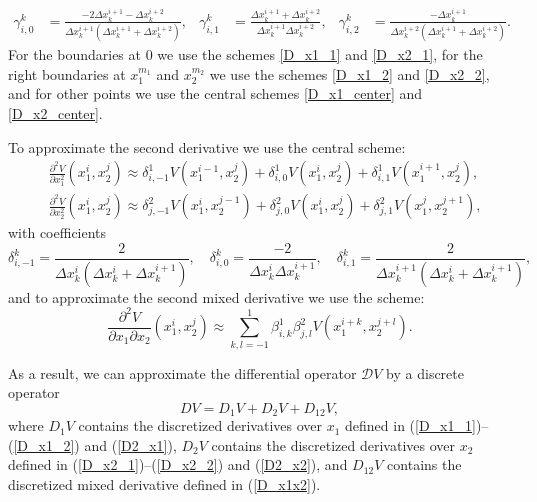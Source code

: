 {\begin{equation*}
\begin{aligned}
		\gamma^k_{i, 0} &= \frac{-2\Delta x_k^{i+1} - \Delta x_k^{i+2}}{\Delta x_k^{i+1} (\Delta x_k^{i+1} + \Delta x_k^{i+2})}, & \gamma^k_{i, 1} &= \frac{\Delta x_k^{i+1} + \Delta x_k^{i+2}}{\Delta x_k^{i+1} \Delta x_k^{i+2}},  & \gamma^k_{i, 2} &= \frac{-\Delta x_k^{i+1}}{\Delta x_k^{i+2} (\Delta x_k^{i+1} + \Delta x_k^{i+2})} .
	\end{aligned}
\end{equation*}
For the boundaries at $0$ we use the schemes \eqref{D_x1_1} and \eqref{D_x2_1}, for the right boundaries at $x_1^{m_1}$ and $x_2^{m_2}$ we use the schemes \eqref{D_x1_2} and \eqref{D_x2_2}, and for other points we use the central schemes \eqref{D_x1_center} and \eqref{D_x2_center}.

To approximate the second derivative we use the central scheme:
\begin{align}
	&	\frac{\partial^2 V}{\partial x_1^2}(x_1^i, x_2^j) \approx \delta^1_{i, -1} V(x_1^{i-1}, x_2^j) + \delta^1_{i, 0} V(x_1^{i}, x_2^j)+ \delta^1_{i, 1} V(x_1^{i+1}, x_2^j), \label{D2_x1} \\
&	\frac{\partial^2 V}{\partial x_2^2}(x_1^i, x_2^j) \approx \delta^2_{j, -1} V(x_1^i, x_2^{j-1}) + \delta^2_{j, 0} V(x_1^{i}, x_2^j)+ \delta^2_{j, 1} V(x_1^j, x_2^{j+1}) \label{D2_x2},
\end{align}
with coefficients
\begin{equation*}
		\delta^k_{i, -1} = \frac{2}{\Delta x_k^{i} (\Delta x_k^{i} + \Delta x_k^{i+1})}, \quad \delta^k_{i, 0} = \frac{-2}{\Delta x_k^{i} \Delta x_k^{i+1}}, \quad \delta^k_{i, 1} = \frac{2}{\Delta x_k^{i+1} (\Delta x_k^{i} + \Delta x_k^{i+1})},
\end{equation*}	
and to approximate the second mixed derivative we use the scheme:
\begin{equation}
	\frac{\partial^2 V}{\partial x_1 \partial x_2} (x_1^i, x_2^j) \approx \sum_{k, l = -1}^1 \beta_{i, k}^1 \beta_{j, l}^2 V(x_1^{i+k}, x_2^{j+l}). \label{D_x1x2}	
\end{equation}

As a result, we can approximate the differential operator $\mathcal{D} V$ by a discrete operator
\begin{equation}
	D V = D_1 V + D_2 V + D_{12} V,
\end{equation}
where $D_1 V$ contains the discretized derivatives over $x_1$ defined in (\ref{D_x1_1})--(\ref{D_x1_2}) and (\ref{D2_x1}), $D_2 V$ contains the discretized derivatives over $x_2$ defined in (\ref{D_x2_1})--(\ref{D_x2_2}) and (\ref{D2_x2}), and $D_{12} V$ contains the discretized mixed derivative defined in (\ref{D_x1x2}).

}
